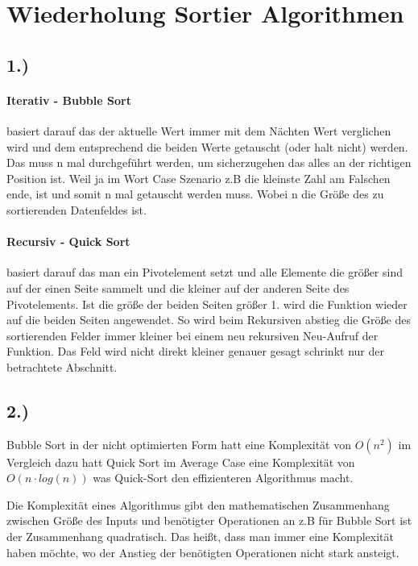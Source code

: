 \documentclass{article}
\begin{document}
\section*{Wiederholung Sortier Algorithmen}

\subsection*{1.)}

\paragraph*{Iterativ - Bubble Sort}
basiert darauf das der aktuelle Wert immer mit dem Nächten Wert verglichen wird und dem entsprechend die beiden Werte getauscht (oder halt nicht) werden. Das muss n mal durchgeführt werden, um sicherzugehen das alles an der richtigen Position ist. Weil ja im Wort Case Szenario z.B die kleinste Zahl am Falschen ende, ist und somit n mal getauscht werden muss. Wobei n die Größe des zu sortierenden Datenfeldes ist.

\paragraph*{Recursiv - Quick Sort} 
basiert darauf das man ein Pivotelement setzt und alle Elemente die größer sind auf der einen Seite sammelt und die kleiner auf der anderen Seite des Pivotelements. Ist die größe der beiden Seiten größer 1. wird die Funktion wieder auf die beiden Seiten angewendet. So wird beim Rekursiven abstieg die Größe des sortierenden Felder immer kleiner bei einem neu rekursiven Neu-Aufruf der Funktion. Das Feld wird nicht direkt kleiner genauer gesagt schrinkt nur der betrachtete Abschnitt.

\subsection*{2.)}

Bubble Sort in der nicht optimierten Form hatt eine Komplexität von \( O(n ^ 2) \) im Vergleich dazu hatt Quick Sort im Average Case eine Komplexität von \( O( n \cdot log(n) ) \) was Quick-Sort den effizienteren Algorithmus macht. \newline

Die Komplexität eines Algorithmus gibt den mathematischen Zusammenhang zwischen Größe des Inputs und benötigter Operationen an z.B für Bubble Sort ist der Zusammenhang quadratisch. Das heißt, dass man immer eine Komplexität haben möchte, wo der Anstieg der benötigten Operationen nicht stark ansteigt.
\end{document}
